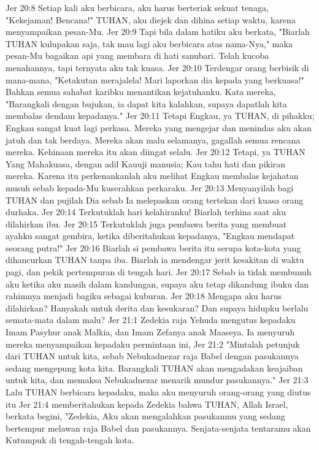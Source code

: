 Jer 20:8  Setiap kali aku berbicara, aku harus berteriak sekuat tenaga, "Kekejaman! Bencana!" TUHAN, aku diejek dan dihina setiap waktu, karena menyampaikan pesan-Mu.
Jer 20:9  Tapi bila dalam hatiku aku berkata, "Biarlah TUHAN kulupakan saja, tak mau lagi aku berbicara atas nama-Nya," maka pesan-Mu bagaikan api yang membara di hati sanubari. Telah kucoba menahannya, tapi ternyata aku tak kuasa.
Jer 20:10  Terdengar orang berbisik di mana-mana, "Ketakutan merajalela! Mari laporkan dia kepada yang berkuasa!" Bahkan semua sahabat karibku menantikan kejatuhanku. Kata mereka, "Barangkali dengan bujukan, ia dapat kita kalahkan, supaya dapatlah kita membalas dendam kepadanya."
Jer 20:11  Tetapi Engkau, ya TUHAN, di pihakku; Engkau sangat kuat lagi perkasa. Mereka yang mengejar dan menindas aku akan jatuh dan tak berdaya. Mereka akan malu selamanya, gagallah semua rencana mereka. Kehinaan mereka itu akan diingat selalu.
Jer 20:12  Tetapi, ya TUHAN Yang Mahakuasa, dengan adil Kauuji manusia; Kau tahu hati dan pikiran mereka. Karena itu perkenankanlah aku melihat Engkau membalas kejahatan musuh sebab kepada-Mu kuserahkan perkaraku.
Jer 20:13  Menyanyilah bagi TUHAN dan pujilah Dia sebab Ia melepaskan orang tertekan dari kuasa orang durhaka.
Jer 20:14  Terkutuklah hari kelahiranku! Biarlah terhina saat aku dilahirkan ibu.
Jer 20:15  Terkutuklah juga pembawa berita yang membuat ayahku sangat gembira, ketika diberitahukan kepadanya, "Engkau mendapat seorang putra!"
Jer 20:16  Biarlah si pembawa berita itu serupa kota-kota yang dihancurkan TUHAN tanpa iba. Biarlah ia mendengar jerit kesakitan di waktu pagi, dan pekik pertempuran di tengah hari.
Jer 20:17  Sebab ia tidak membunuh aku ketika aku masih dalam kandungan, supaya aku tetap dikandung ibuku dan rahimnya menjadi bagiku sebagai kuburan.
Jer 20:18  Mengapa aku harus dilahirkan? Hanyakah untuk derita dan kesukaran? Dan supaya hidupku berlalu semata-mata dalam malu?
Jer 21:1  Zedekia raja Yehuda mengutus kepadaku Imam Pasyhur anak Malkia, dan Imam Zefanya anak Maaseya. Ia menyuruh mereka menyampaikan kepadaku permintaan ini,
Jer 21:2  "Mintalah petunjuk dari TUHAN untuk kita, sebab Nebukadnezar raja Babel dengan pasukannya sedang mengepung kota kita. Barangkali TUHAN akan mengadakan keajaiban untuk kita, dan memaksa Nebukadnezar menarik mundur pasukannya."
Jer 21:3  Lalu TUHAN berbicara kepadaku, maka aku menyuruh orang-orang yang diutus itu
Jer 21:4  memberitahukan kepada Zedekia bahwa TUHAN, Allah Israel, berkata begini, "Zedekia, Aku akan mengalahkan pasukanmu yang sedang bertempur melawan raja Babel dan pasukannya. Senjata-senjata tentaramu akan Kutumpuk di tengah-tengah kota.
